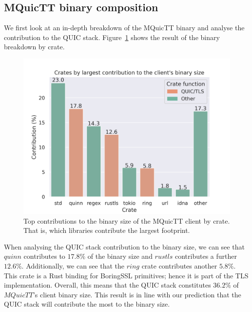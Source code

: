 \subsection{MQuicTT binary composition} \label{sec:binary_sizes}

We first look at an in-depth breakdown of the MQuicTT binary and analyse the contribution to the QUIC stack.
Figure~\ref{fig:mquictt_client_bin} shows the result of the binary breakdown by crate.

\begin{figure}[ht]
    \centering
    \includegraphics[width=1\linewidth]{images/mquictt_binary_client.png}
    \caption{Top contributions to the binary size of the MQuicTT client by crate. That is, which libraries contribute the largest footprint.}
    \label{fig:mquictt_client_bin}
\end{figure}

When analysing the QUIC stack contribution to the binary size, we can see that $quinn$ contributes to $17.8\%$ of the binary size and $rustls$ contributes a further $12.6\%$.
Additionally, we can see that the $ring$ crate contributes another $5.8\%$.
This crate is a Rust binding for BoringSSL primitives; hence it is part of the TLS implementation.
Overall, this means that the QUIC stack constitutes $36.2\%$ of $MQuicTT$'s client binary size.
This result is in line with our prediction that the QUIC stack will contribute the most to the binary size.

